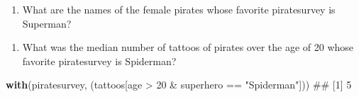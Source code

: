 \documentclass[]{book}
\newenvironment{Shaded}{\begin{snugshade}}{\end{snugshade}}
\newcommand{\KeywordTok}[1]{\textcolor[rgb]{0.13,0.29,0.53}{\textbf{{#1}}}}
\newcommand{\DecValTok}[1]{\textcolor[rgb]{0.00,0.00,0.81}{{#1}}}
\newcommand{\StringTok}[1]{\textcolor[rgb]{0.31,0.60,0.02}{{#1}}}
\newcommand{\NormalTok}[1]{{#1}}
\providecommand{\tightlist}{%
  \setlength{\itemsep}{0pt}\setlength{\parskip}{0pt}}
\theoremstyle{definition}
\theoremstyle{definition}
\theoremstyle{remark}
\begin{document}
\begin{Shaded}
\end{Shaded}

\begin{enumerate}
\def\labelenumi{\arabic{enumi}.}
\setcounter{enumi}{8}
\tightlist
\item
  What are the names of the female pirates whose favorite piratesurvey
  is Superman?
\end{enumerate}

\begin{Shaded}
\end{Shaded}

\begin{enumerate}
\def\labelenumi{\arabic{enumi}.}
\setcounter{enumi}{9}
\tightlist
\item
  What was the median number of tattoos of pirates over the age of 20
  whose favorite piratesurvey is Spiderman?
\end{enumerate}

\begin{Shaded}
\begin{Highlighting}[]
\KeywordTok{with}\NormalTok{(piratesurvey, (tattoos[age >}\StringTok{ }\DecValTok{20} \NormalTok{&}\StringTok{ }\NormalTok{superhero ==}\StringTok{ "Spiderman"}\NormalTok{]))}
\NormalTok{## [1] 5}
\end{Highlighting}
\end{Shaded}


\end{document}
